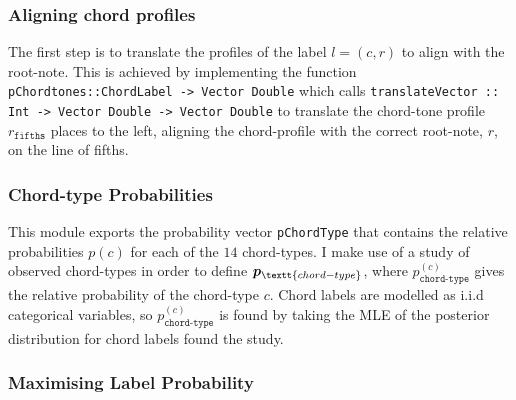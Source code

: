\documentclass[12pt,a4paper,twoside,openany]{report} \usepackage[pdfborder={0 0 0}]{hyperref}    %
\theoremstyle{definition} \newtheorem{definition}{Definition}[section]
\begin{document}
    \subsubsection{Aligning chord profiles}
    The first step is to translate the profiles of the label $l=(c,r)$ to align with the root-note. This is achieved by
    implementing the function \texttt{pChordtones::ChordLabel -> Vector Double} which calls \texttt{translateVector ::
    Int -> Vector Double -> Vector Double} to translate the chord-tone profile $r_{\texttt{fifths}}$ places to the left,
    aligning the chord-profile with the correct root-note, $r$, on the line of fifths. 

    \subsubsection{Chord-type Probabilities}

    This module exports the probability vector \texttt{pChordType} that contains the relative probabilities $p(c)$ for each of the
    $14$ chord-types. I make use of a study of observed chord-types \cite{finkensiepChordTypesOrnamentation2023} in order to define
    $\bm{p}_{\textt{chord-type}}$, where $p^{(c)}_{\texttt{chord-type}}$ gives the relative probability of the
    chord-type $c$. Chord labels are modelled as i.i.d categorical variables, so $p^{(c)}_{\texttt{chord-type}}$ is
    found by taking the MLE of the posterior distribution for chord labels found the study.

    \subsubsection{Maximising Label Probability}
\end{document}
